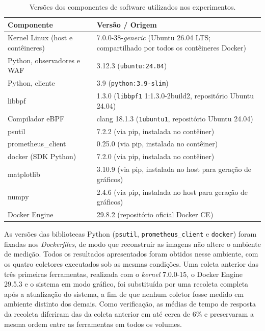 \begin{table}[htbp]
\centering
\caption{Versões dos componentes de software utilizados nos experimentos.}
\label{tab:versoes_software}
\begin{tabularx}{\textwidth}{lX}
\hline
\textbf{Componente} & \textbf{Versão / Origem} \\
\hline
Kernel Linux (host e contêineres) & 7.0.0-38-\textit{generic} (Ubuntu 26.04 LTS; compartilhado por todos os contêineres Docker) \\
Python, observadores e WAF & 3.12.3 (\texttt{ubuntu:24.04}) \\
Python, cliente           & 3.9 (\texttt{python:3.9-slim}) \\
libbpf                     & 1.3.0 (\texttt{libbpf1} 1:1.3.0-2build2, repositório Ubuntu 24.04) \\
Compilador eBPF            & clang 18.1.3 (\texttt{1ubuntu1}, repositório Ubuntu 24.04) \\
psutil                     & 7.2.2 (via pip, instalada no contêiner) \\
prometheus\_client         & 0.25.0 (via pip, instalada no contêiner) \\
docker (SDK Python)         & 7.2.0 (via pip, instalada no contêiner) \\
matplotlib                 & 3.10.9 (via pip, instalada no host para geração de gráficos) \\
numpy                      & 2.4.6 (via pip, instalada no host para geração de gráficos) \\
Docker Engine              & 29.8.2 (repositório oficial Docker CE) \\
\hline
\end{tabularx}
\end{table}

As versões das bibliotecas Python (\texttt{psutil}, \texttt{prometheus\_client} e \texttt{docker}) foram fixadas nos \textit{Dockerfiles}, de modo que reconstruir as imagens não altere o ambiente de medição. Todos os resultados apresentados foram obtidos nesse ambiente, com os quatro coletores executados sob as mesmas condições. Uma coleta anterior das três primeiras ferramentas, realizada com o \textit{kernel} 7.0.0-15, o Docker Engine 29.5.3 e o sistema em modo gráfico, foi substituída por uma recoleta completa após a atualização do sistema, a fim de que nenhum coletor fosse medido em ambiente distinto dos demais. Como verificação, as médias de tempo de resposta da recoleta diferiram das da coleta anterior em até cerca de 6\% e preservaram a mesma ordem entre as ferramentas em todos os volumes.

